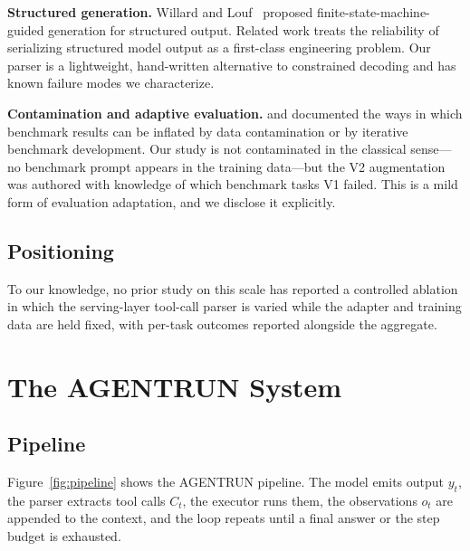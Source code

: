 \documentclass[10pt,twocolumn]{article}
\begin{document}
\textbf{Structured generation.} Willard and Louf~\citep{willard2023guided} proposed finite-state-machine-guided generation for structured output. Related work treats the reliability of serializing structured model output as a first-class engineering problem. Our parser is a lightweight, hand-written alternative to constrained decoding and has known failure modes we characterize.

\textbf{Contamination and adaptive evaluation.} \citet{sainz2023contamination} and \citet{deng2023contamination} documented the ways in which benchmark results can be inflated by data contamination or by iterative benchmark development. Our study is not contaminated in the classical sense---no benchmark prompt appears in the training data---but the V2 augmentation was authored with knowledge of which benchmark tasks V1 failed. This is a mild form of evaluation adaptation, and we disclose it explicitly.

\subsection{Positioning}

To our knowledge, no prior study on this scale has reported a controlled ablation in which the serving-layer tool-call parser is varied while the adapter and training data are held fixed, with per-task outcomes reported alongside the aggregate.

\section{The AGENTRUN System}

\subsection{Pipeline}

Figure~\ref{fig:pipeline} shows the AGENTRUN pipeline. The model emits output $y_t$, the parser extracts tool calls $C_t$, the executor runs them, the observations $o_t$ are appended to the context, and the loop repeats until a final answer or the step budget is exhausted.
\end{document}
